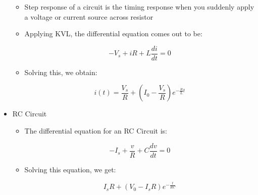 \begin{itemize}
    \begin{itemize}

      \item Step response of a circuit is the timing response when you suddenly apply a voltage or current source across resistor

      \item Applying KVL, the differential equation comes out to be:

        $$\boxed{-V_s+iR+L\dfrac{di}{dt}=0}$$

      \item Solving this, we obtain:

        $$\boxed{i(t)=\dfrac{V_s}{R}+\left(I_0-\dfrac{V_s}{R}\right)e^{-\frac{R}{L}t}}$$

    \end{itemize}

  \item RC Circuit

    \begin{itemize}

      \item The differential equation for an RC Circuit is:

        $$\boxed{-I_s+\dfrac{v}{R}+C\dfrac{dv}{dt}=0}$$

      \item Solving this equation, we get:

        $$\boxed{I_sR+(V_0-I_sR)e^{-\frac{t}{RC}}}$$

    \end{itemize}

\end{itemize}



